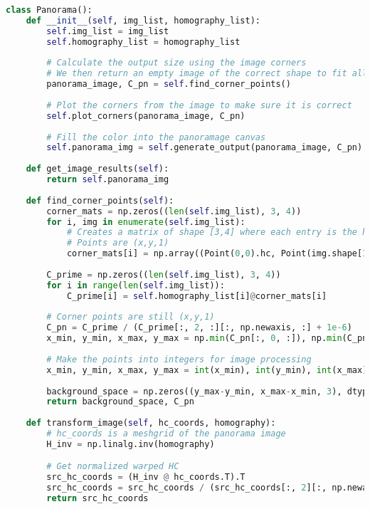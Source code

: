 \documentclass{article}
\begin{document}
\begin{lstlisting}[language=Python]
class Panorama():
    def __init__(self, img_list, homography_list):
        self.img_list = img_list
        self.homography_list = homography_list
        
        # Calculate the output size using the image corners
        # We then return an empty image of the correct shape to fit all points
        panorama_image, C_pn = self.find_corner_points()
        
        # Plot the corners from the image to make sure it is correct
        self.plot_corners(panorama_image, C_pn)
        
        # Fill the color into the panoramage canvas
        self.panorama_img = self.generate_output(panorama_image, C_pn)
        
    def get_image_results(self):
        return self.panorama_img
        
    def find_corner_points(self):
        corner_mats = np.zeros((len(self.img_list), 3, 4))
        for i, img in enumerate(self.img_list):
            # Creates a matrix of shape [3,4] where each entry is the hc coordinate of a corner point
            # Points are (x,y,1)
            corner_mats[i] = np.array((Point(0,0).hc, Point(img.shape[1], 0).hc, Point(img.shape[1], img.shape[0]).hc, Point(0, img.shape[0]).hc)).T
        
        C_prime = np.zeros((len(self.img_list), 3, 4))
        for i in range(len(self.img_list)):
            C_prime[i] = self.homography_list[i]@corner_mats[i]
        
        # Corner points are still (x,y,1)
        C_pn = C_prime / (C_prime[:, 2, :][:, np.newaxis, :] + 1e-6)
        x_min, y_min, x_max, y_max = np.min(C_pn[:, 0, :]), np.min(C_pn[:, 1, :]), np.max(C_pn[:, 0, :]), np.max(C_pn[:, 1, :])
        
        # Make the points into integers for image processing
        x_min, y_min, x_max, y_max = int(x_min), int(y_min), int(x_max), int(y_max)
        
        background_space = np.zeros((y_max-y_min, x_max-x_min, 3), dtype=np.uint8)
        return background_space, C_pn
    
    def transform_image(self, hc_coords, homography):
        # hc_coords is a meshgrid of the panorama image
        H_inv = np.linalg.inv(homography)

        # Get normalized warped HC
        src_hc_coords = (H_inv @ hc_coords.T).T
        src_hc_coords = src_hc_coords / (src_hc_coords[:, 2][:, np.newaxis] + 1e-6)
        return src_hc_coords
    

\end{lstlisting}
\end{document}

